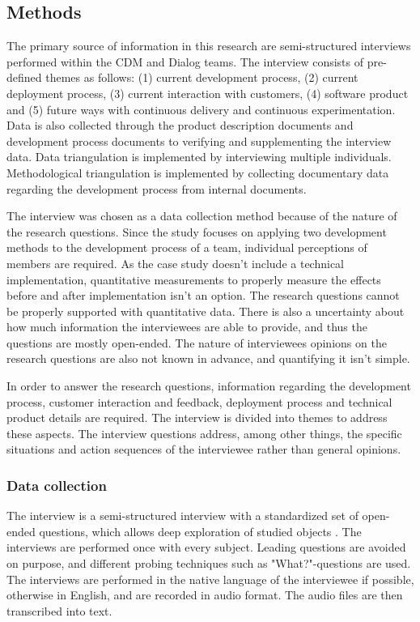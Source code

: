 \documentclass[english]{tktltiki2}
\theoremstyle{definition}
\theoremstyle{remark}
\begin{document}
\subsection{Methods} %
The primary source of information in this research are semi-structured interviews \cite{runeson2009guidelines} performed within the CDM and Dialog teams. The interview consists of pre-defined themes as follows: (1) current development process, (2) current deployment process, (3) current interaction with customers, (4) software product and (5) future ways with continuous delivery and continuous experimentation. Data is also collected through the product description documents and development process documents to verifying and supplementing the interview data. Data triangulation is implemented by interviewing multiple individuals. Methodological triangulation is implemented by collecting documentary data regarding the development process from internal documents. 

The interview was chosen as a data collection method because of the nature of the research questions. Since the study focuses on applying two development methods to the development process of a team, individual perceptions of members are required. As the case study doesn't include a technical implementation, quantitative measurements to properly measure the effects before and after implementation isn't an option. The research questions cannot be properly supported with quantitative data. There is also a uncertainty about how much information the interviewees are able to provide, and thus the questions are mostly open-ended. The nature of interviewees opinions on the research questions are also not known in advance, and quantifying it isn't simple. 

In order to answer the research questions, information regarding the development process, customer interaction and feedback, deployment process and technical product details are required. The interview is divided into themes to address these aspects. The interview questions address, among other things, the specific situations and action sequences of the interviewee rather than general opinions. 

\subsubsection{Data collection}
The interview is a semi-structured interview with a standardized set of open-ended questions, which allows deep exploration of studied objects \cite{runeson2009guidelines}. The interviews are performed once with every subject. Leading questions are avoided on purpose, and different probing techniques such as "What?"-questions are used. The interviews are performed in the native language of the interviewee if possible, otherwise in English, and are recorded in audio format. The audio files are then transcribed into text.
\end{document}
